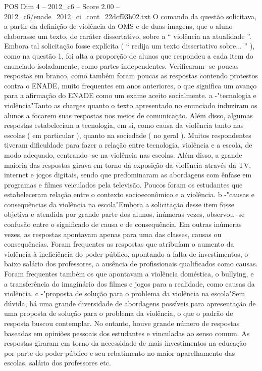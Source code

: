 \begin{textsample}{POS Dim 4 – 2012\_c6 – Score 2.00 – 2012\_c6/enade\_2012\_ci\_cont\_22dcf93b02.txt}
O comando da questão solicitava, a partir da definição de violência da OMS e de duas imagens, que o aluno elaborasse um texto, de caráter dissertativo, sobre a “ violência na atualidade ”.
Embora tal solicitação fosse explícita ( “ redija um texto dissertativo sobre... ” ), como na questão 1, foi alta a proporção de alunos que respondeu a cada item do enunciado isoladamente, como partes independentes.
Verificaram -se poucas respostas em branco, como também foram poucas as respostas contendo protestos contra o ENADE, muito frequentes em anos anteriores, o que significa um avanço para a afirmação do ENADE como um exame aceito socialmente. a -"tecnologia e violência"Tanto as charges quanto o texto apresentado no enunciado induziram os alunos a focarem suas respostas nos meios de comunicação.
Além disso, algumas respostas estabeleciam a tecnologia, em si, como causa da violência tanto nas escolas ( em particular ), quanto na sociedade ( no geral ).
Muitos respondentes tiveram dificuldade para fazer a relação entre tecnologia, violência e a escola, de modo adequado, centrando -se na violência nas escolas.
Além disso, a grande maioria das respostas girava em torno da exposição da violência através da TV, internet e jogos digitais, sendo que predominaram as abordagens com ênfase em programas e filmes veiculados pela televisão.
Poucos foram os estudantes que estabeleceram relação entre o contexto socioeconômico e a violência. b -"causas e consequências da violência na escola"Embora a solicitação desse item fosse objetiva e atendida por grande parte dos alunos, inúmeras vezes, observou -se confusão entre o significado de causa e de consequência.
Em outras inúmeras vezes, as respostas apontavam apenas para uma das classes, causas ou consequências.
Foram frequentes as respostas que atribuíam o aumento da violência à ineficiência do poder público, apontando a falta de investimentos, o baixo salário dos professores, a ausência de profissionais qualificados como causas.
Foram frequentes também os que apontavam a violência doméstica, o bullying, e a transferência do imaginário dos filmes e jogos para a realidade, como causas da violência. c -"proposta de solução para o problema da violência na escola"Sem dúvida, há uma grande diversidade de abordagens possíveis para apresentação de uma proposta de solução para o problema da violência, o que o padrão de resposta buscou contemplar.
No entanto, houve grande número de respostas baseadas em opiniões pessoais dos estudantes e vinculadas ao senso comum.
As respostas giraram em torno da necessidade de mais investimentos na educação por parte do poder público e seu rebatimento no maior aparelhamento das escolas, salário dos professores etc.

\end{textsample}
